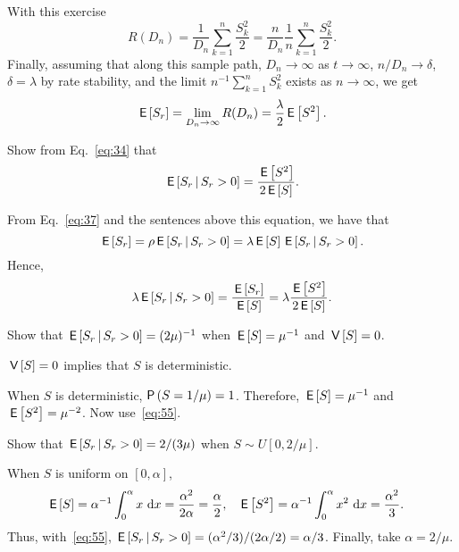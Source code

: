 With this exercise
\begin{equation*}
R(D_n)
= \frac{1}{D_n} \sum_{k=1}^n \frac{S_k^2}2 = \frac{n}{D_n} \frac 1 n\sum_{k=1}^n \frac{S_k^2}2.
\end{equation*}
Finally, assuming that along this sample path, $D_n\to \infty$ as
$t\to \infty$, $n/D_n \to \delta$, $\delta=\lambda$ by rate stability,
and the limit $n^{-1}\sum_{k=1}^n S_k^2$ exists as $n\to\infty$, we
get
\begin{equation}\label{eq:34}
\,\mathsf{E}\left[S_r\right] = \lim_{D_n\to\infty} R(D_n) = \frac{\lambda}2 \,\mathsf{E}\left[S^2\right].
\end{equation}


\begin{exercise}\label{ex:9}
Show from Eq.~\eqref{eq:34} that 
\begin{equation}\label{eq:55}
\,\mathsf{E}\left[S_r\,\middle|\, S_r>0\right] = \frac{\,\mathsf{E}\left[S^2\right]}{2 \,\mathsf{E}\left[S\right]}.
\end{equation}
\begin{solution}
 From Eq.~\eqref{eq:37} and the sentences above this equation,
    we have that
    \begin{equation*}
    \,\mathsf{E}\left[S_r\right] = \rho \,\mathsf{E}\left[S_r\,\middle|\, S_r>0\right]=\lambda \,\mathsf{E}\left[S\right] \,\mathsf{E}\left[S_r\,\middle|\, S_r>0\right].
    \end{equation*}
Hence,
    \begin{equation*}
    \lambda \,\mathsf{E}\left[S_r\,\middle|\, S_r>0\right] = \frac{\,\mathsf{E}\left[S_r\right]}{\,\mathsf{E}\left[S\right]} = \lambda \frac{\,\mathsf{E}\left[S^2\right]}{2 \,\mathsf{E}\left[S\right]}.
    \end{equation*}
\end{solution}
\end{exercise}


\begin{exercise}
Show that  $\,\mathsf{E}\left[S_r\,\middle|\, S_r>0\right] = (2\mu)^{-1}$
  when $\,\mathsf{E}\left[S\right]=\mu^{-1}$ and $\,\mathsf{V}\left[S\right] = 0$.
  \begin{hint}
    $\,\mathsf{V}\left[S\right] = 0$ implies that $S$ is deterministic.
  \end{hint}
\begin{solution}
 When $S$ is deterministic, $\P{S=1/\mu} = 1$. Therefore, $\,\mathsf{E}\left[S\right]=\mu^{-1}$ and $\,\mathsf{E}\left[S^2\right] = \mu^{-2}$.  Now use~\eqref{eq:55}.
\end{solution}
\end{exercise}

\begin{exercise}
Show that $\,\mathsf{E}\left[S_r\,\middle|\, S_r>0\right] = 2/(3\mu)$ when  $S \sim U[0,2/\mu]$.
\begin{solution}
 When $S$ is uniform on $[0, \alpha]$,
 \begin{align*}
    \,\mathsf{E}\left[S\right] &= \alpha^{-1}\int_0^\alpha x \, \,\text{d}x =\frac{\alpha^2}{2 \alpha} =  \frac{\alpha}2, 
&
\,\mathsf{E}\left[S^2\right] &= \alpha^{-1}\int_0^\alpha x^2 \, \,\text{d}x = \frac{\alpha^2}3.   
 \end{align*}
 Thus, with~\eqref{eq:55}, $\,\mathsf{E}\left[S_r\,\middle|\, S_r>0\right] = (\alpha^2/3)/(2 \alpha/2) = \alpha/3$. Finally, take $\alpha=2/\mu$. 
\end{solution}
\end{exercise}

